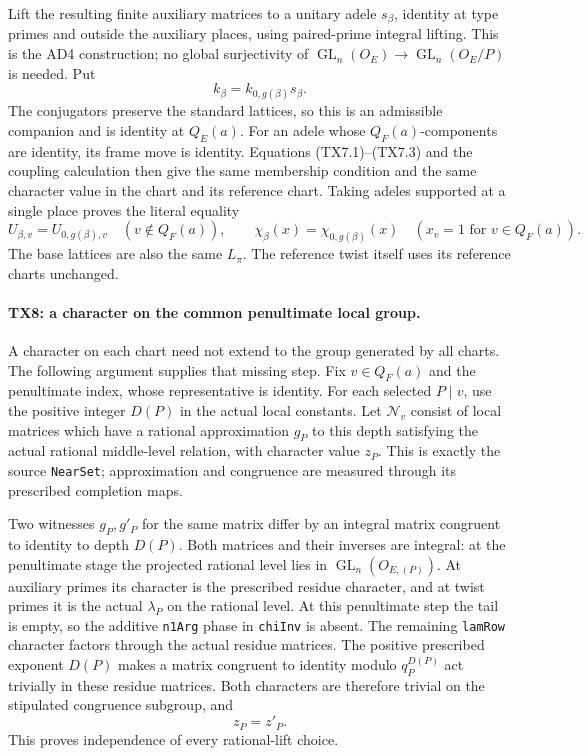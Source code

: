 Lift the resulting finite auxiliary matrices to a unitary adele
\(s_\beta\), identity at type primes and outside the auxiliary
places, using paired-prime integral lifting. This is the AD4
construction; no global surjectivity of
\(\operatorname{GL}_n(O_E)\to\operatorname{GL}_n(O_E/P)\)
is needed. Put
\[
 k_\beta=k_{0,g(\beta)}s_\beta.
 \tag{TX7.3}
\]
The conjugators preserve the standard lattices, so this is an
admissible companion and is identity at \(Q_E(a)\).
For an adele whose \(Q_F(a)\)-components are identity, its frame
move is identity. Equations (TX7.1)--(TX7.3) and the coupling
calculation then give the same membership condition and the same
character value in the chart and its reference chart. Taking
adeles supported at a single place proves the literal equality
\[
 U_{\beta,v}=U_{0,g(\beta),v}\quad(v\notin Q_F(a)),
 \qquad
 \chi_\beta(x)=\chi_{0,g(\beta)}(x)
       \quad(x_v=1\text{ for }v\in Q_F(a)).
 \tag{TX7.4}
\]
The base lattices are also the same \(L_\pi\). The reference
twist itself uses its reference charts unchanged.

\paragraph{TX8: a character on the common penultimate local group.}
A character on each chart need not extend to the group generated
by all charts. The following argument supplies that missing step.
Fix \(v\in Q_F(a)\) and the penultimate index, whose representative
is identity. For each selected \(P\mid v\), use the positive
integer \(D(P)\) in the actual local constants. Let
\(\mathcal N_v\) consist of local matrices which have a rational
approximation \(g_P\) to this depth satisfying the actual rational
middle-level relation, with character value \(z_P\).
This is exactly the source \texttt{NearSet}; approximation and
congruence are measured through its prescribed completion maps.

Two witnesses \(g_P,g'_P\) for the same matrix differ by an
integral matrix congruent to identity to depth \(D(P)\).
Both matrices and their inverses are integral: at the penultimate
stage the projected rational level lies in
\(\operatorname{GL}_n(O_{E,(P)})\). At auxiliary primes its
character is the prescribed residue character, and at twist
primes it is the actual \(\lambda_P\) on the rational level.
At this penultimate step the tail is empty, so the additive
\texttt{n1Arg} phase in \texttt{chiInv} is absent. The remaining
\texttt{lamRow} character factors through the actual residue
matrices. The positive prescribed exponent \(D(P)\) makes a
matrix congruent to identity modulo \(q_P^{D(P)}\) act trivially
in these residue matrices. Both characters are therefore trivial
on the stipulated congruence subgroup, and
\[
 z_P=z'_P.
 \tag{TX8.1}
\]
This proves independence of every rational-lift choice.

